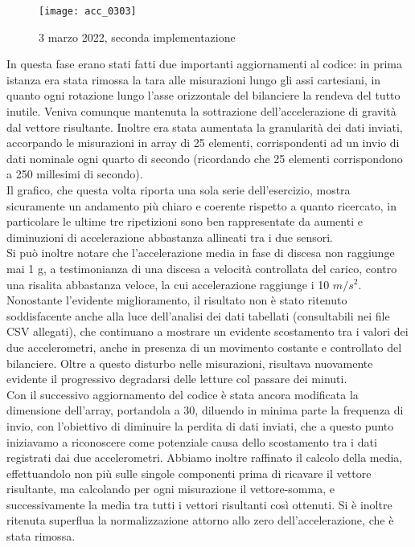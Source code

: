 \documentclass[fleqn,10pt]{SelfArx} %
\begin{document}
\begin{figure}[htb]\centering
	\texttt{[image: acc\_0303]}
	\caption{3 marzo 2022, seconda implementazione}
	\label{fig:accelerazione 0303}
\end{figure}

In questa fase erano stati fatti due importanti aggiornamenti al codice: in prima istanza era stata rimossa la tara alle 
misurazioni lungo gli assi cartesiani, in quanto ogni rotazione lungo l'asse orizzontale del bilanciere la rendeva del tutto 
inutile. Veniva comunque mantenuta la sottrazione dell'accelerazione di gravità dal vettore risultante. Inoltre era stata 
aumentata la granularità dei dati inviati, accorpando le misurazioni in array di 25 elementi, corrispondenti ad un invio 
di dati nominale ogni quarto di secondo (ricordando che 25 elementi corrispondono a 250 millesimi di secondo).\\
Il grafico, che questa volta riporta una sola serie dell'esercizio, mostra sicuramente un andamento più chiaro e coerente 
rispetto a quanto ricercato, in particolare le ultime tre ripetizioni sono ben rappresentate da aumenti e diminuzioni di 
accelerazione abbastanza allineati tra i due sensori.\\
Si può inoltre notare che l'accelerazione media in fase di discesa non raggiunge mai 1 g, a testimonianza di una discesa 
a velocità controllata del carico, contro una risalita abbastanza veloce, la cui accelerazione raggiunge i 10 $ m/s^2 $.\\

Nonostante l'evidente miglioramento, il risultato non è stato ritenuto soddisfacente anche alla luce dell'analisi dei dati 
tabellati (consultabili nei file CSV allegati), che continuano a mostrare un evidente scostamento tra 
i valori dei due accelerometri, anche in presenza di un movimento costante e controllato del bilanciere.
Oltre a questo disturbo nelle misurazioni, risultava nuovamente evidente il progressivo degradarsi delle letture col passare 
dei minuti.\\

Con il successivo aggiornamento del codice è stata ancora modificata la dimensione dell'array, portandola a 30, diluendo 
in minima parte la frequenza di invio, con l'obiettivo di diminuire la perdita di dati inviati, che a questo punto iniziavamo 
a riconoscere come potenziale causa dello scostamento tra i dati registrati dai due accelerometri. Abbiamo inoltre raffinato 
il calcolo della media, effettuandolo non più sulle singole componenti prima di ricavare il vettore risultante, ma calcolando 
per ogni misurazione il vettore-somma, e successivamente la media tra tutti i vettori risultanti così ottenuti. Si è inoltre 
ritenuta superflua la normalizzazione attorno allo zero dell'accelerazione, che è stata rimossa.
\end{document}
